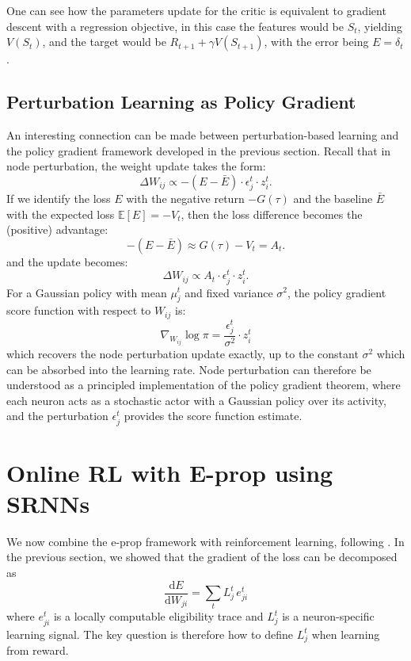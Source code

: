 One can see how the parameters update for the critic is equivalent to gradient descent with a regression objective, in this case the features would be $S_t$, yielding $V(S_t)$, and the target would be $R_{t+1} + \gamma V(S_{t+1})$, with the error being $E = \delta_t$.

\subsection{Perturbation Learning as Policy Gradient}
\label{subsec:perturbation-learning-connection}

An interesting connection can be made between perturbation-based learning
and the policy gradient framework developed in the previous section. Recall
that in node perturbation, the weight update takes the form:
\begin{equation}
    \Delta W_{ij} \propto -(E - \bar{E}) \cdot \epsilon_j^t \cdot z_i^t.
\end{equation}
If we identify the loss $E$ with the negative return $-G(\tau)$ and the
baseline $\bar{E}$ with the expected loss $\mathbb{E}[E] = -V_t$, then the
loss difference becomes the (positive) advantage:
\begin{equation}
-(E - \bar{E}) \approx G(\tau) - V_t = A_t.
\end{equation}
and the update becomes:
\begin{equation}
    \Delta W_{ij} \propto A_t \cdot \epsilon_j^t \cdot z_i^t.
\end{equation}
For a Gaussian policy with mean $\mu_j^t$ and fixed variance $\sigma^2$,
the policy gradient score function with respect to $W_{ij}$ is:
\begin{equation}
    \nabla_{W_{ij}} \log \pi = \frac{\epsilon_j^t}{\sigma^2} \cdot z_i^t
\end{equation}
which recovers the node perturbation update exactly, up to the constant
$\sigma^2$ which can be absorbed into the learning rate. Node perturbation
can therefore be understood as a principled implementation of the policy
gradient theorem, where each neuron acts as a stochastic actor with a
Gaussian policy over its activity, and the perturbation $\epsilon_j^t$
provides the score function estimate.

\section{Online RL with E-prop using SRNNs}
\label{sec:online-rl-eprop}
We now combine the e-prop framework with reinforcement learning, following
\cite{eprop2020}. In the previous section, we showed that the gradient of
the loss can be decomposed as
\begin{equation}
\frac{\mathrm{d}E}{\mathrm{d}W_{ji}} = \sum_t L^t_j \, e^t_{ji}
\end{equation}
where $e^t_{ji}$ is a locally computable eligibility trace and $L^t_j$ is a
neuron-specific learning signal. The key question is therefore how to define
$L^t_j$ when learning from reward.

